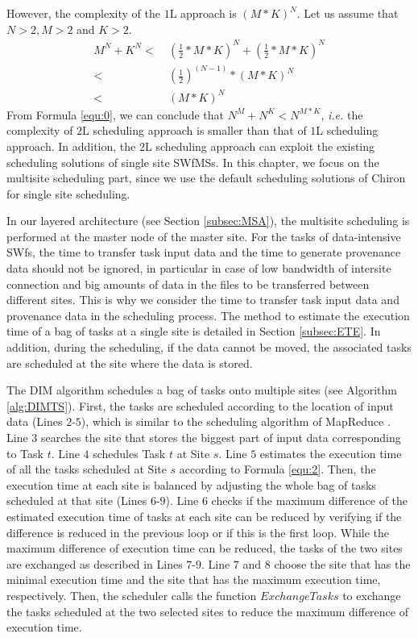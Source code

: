 However, the complexity of the $1$L approach is ${(M * K)}^N$. 
Let us assume that $N > 2, M > 2$ and $K > 2$.
\begin{equation}\label{equ:0}
\begin{split}
M^N + K^N <& ~{(\frac{1}{2} * M * K)}^N + {(\frac{1}{2} * M * K)}^N \\
<& ~{(\frac{1}{2})}^{(N - 1)} * {(M * K)}^N \\
<& ~{(M * K)}^N
\end{split}
\end{equation}
From Formula \ref{equ:0}, we can conclude that $N^M + N^K < N^{M * K}$, \textit{i.e.} the complexity of $2$L scheduling approach is smaller than that of $1$L scheduling approach.
In addition, the $2$L scheduling approach can exploit the existing scheduling solutions of single site SWfMSs. 
In this chapter, we focus on the multisite scheduling part, since we use the default scheduling solutions of Chiron for single site scheduling.

In our layered architecture (see Section \ref{subsec:MSA}), the multisite scheduling is performed at the master node of the master site. For the tasks of data-intensive SWfs,  the time to transfer task input data and the time to generate provenance data should not be ignored, in particular in case of low  bandwidth of intersite connection and big amounts of data in the files to be transferred between different sites. This is why we consider the time to transfer task input data and provenance data in the scheduling process. The method to estimate the execution time of a bag of tasks at a single site is detailed in Section \ref{subsec:ETE}. In addition, during the scheduling, if the data cannot be moved, the associated tasks are scheduled at the site where the data is stored.

The DIM algorithm schedules a bag of tasks onto multiple sites (see Algorithm \ref{alg:DIMTS}). First, the tasks are scheduled according to the location of input data (Lines $2$-$5$), which is similar to the scheduling algorithm of MapReduce \cite{Dean2004}.
Line $3$ searches the site that stores the biggest part of input data corresponding to Task $t$. Line $4$ schedules Task $t$ at Site $s$. Line $5$ estimates the execution time of all the tasks scheduled at Site $s$ according to Formula \ref{equ:2}.
Then, the execution time at each site is balanced by adjusting the whole bag of tasks scheduled at that site (Lines $6$-$9$). Line $6$ checks if the maximum difference of the estimated execution time of tasks at each site can be reduced by verifying if the difference is reduced in the previous loop or if this is the first loop.
While the maximum difference of execution time can be reduced, the tasks of the two sites are exchanged as described in Lines $7$-$9$. Line $7$ and $8$ choose the site that has the minimal execution time and the site that has the maximum execution time, respectively. Then, the scheduler calls the function $ExchangeTasks$ to exchange the tasks scheduled at the two selected sites to reduce the maximum difference of execution time. 

